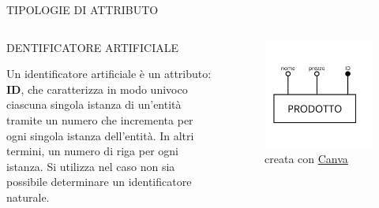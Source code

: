 \documentclass[aspectratio=1610]{beamer}
\begin{document}
\begin{frame}{TIPOLOGIE DI ATTRIBUTO}
    \begin{columns}
            \begin{alertblock}{DENTIFICATORE ARTIFICIALE}
                \begin{minipage}{0.96\linewidth}
                    \justifying
                    Un identificatore artificiale è un attributo: \textbf{ID}, che caratterizza in 
                    modo univoco ciascuna singola istanza di un’entità tramite un numero che 
                    incrementa per ogni singola istanza dell’entità. In altri termini, un numero 
                    di riga per ogni istanza. Si utilizza nel caso non sia possibile determinare un 
                    identificatore naturale.\\
                    \bigskip
                \end{minipage}
            \end{alertblock}
            \begin{figure}
                \includegraphics[width=\linewidth]{img/id_artificiale.png}
                \caption{{creata con \href{www.canva.com}{Canva}}}
            \end{figure}
    \end{columns}
\end{frame}
\end{document}
